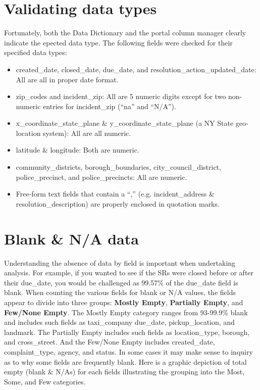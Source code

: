 \documentclass[12pt, titlepage]{article}
\begin{document}
	
		
\section{Validating data types}
\label{sec:datatypes}
Fortunately, both the Data Dictionary and the portal column manager 
clearly indicate the epected data type. The following fields were 
checked for their specified data types:

	
\begin{itemize}
	\item created\_date, closed\_date, due\_date, and resolution\_action\_updated\_date: 
	All are all in proper date format.
	
	\item zip\_codes and incident\_zip: All are 5 numeric digits except 
	for two non-numeric entries for incident\_zip (``na'' and ``N/A'').
	
	\item x\_coordinate\_state\_plane \&  y\_coordinate\_state\_plane 
	(a NY State geo-location system): All are all numeric.
	
	\item latitude \& longitude: Both are numeric.
	
	\item community\_districts, borough\_boundaries, 
	city\_council\_district, police\_precinct, and police\_precincts: All are numeric.
	
	\item Free-form text fields that contain a ``,'' (e.g. incident\_address 
	\& resolution\_description) are properly enclosed in quotation marks.
\end{itemize}	

 

\section{Blank \& N/A data}
\label{sec:blanks}
Understanding the absence of data by field is important 
when undertaking analysis. For example, if you wanted to see if the SRs were
closed before or after their due\_date, you would be challenged 
as 99.57\% of the due\_date field is blank. When counting 
the various fields for blank or N/A values, the fields appear 
to divide into three groups: \textbf{Mostly Empty}, \textbf{Partially Empty}, 
and \textbf{Few/None Empty}. The Mostly Empty category 
ranges from 93-99.9\% blank and includes such fields as 
taxi\_company due\_date, pickup\_location, and 
landmark. The Partially Empty includes such fields as location\_type, borough, 
and cross\_street. And the Few/None Empty includes created\_date, 
complaint\_type, agency, and status. In some cases it may make 
sense to inquiry as to why some fields are frequently blank. Here is a graphic 
depiction of total empty (blank \& N/As) for each fields illustrating
the grouping into the Most, Some, and Few categories. 
\end{document}
